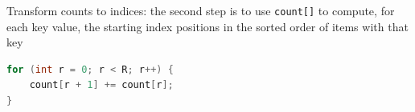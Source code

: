 \documentclass[8pt,a4paper,compress]{beamer}
\begin{document}
\begin{frame}[fragile]
\pause

Transform counts to indices: the second step is to use \lstinline{count[]} to compute, for each key value, the starting index positions in the sorted order of items with that key

\begin{lstlisting}[language=Java]
for (int r = 0; r < R; r++) {
    count[r + 1] += count[r];
}
\end{lstlisting}

\begin{center}
\end{center}
\end{frame}
\end{document}
